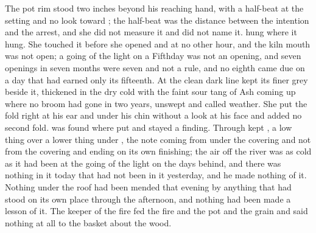 The pot rim stood two inches beyond his reaching hand, with a half-beat at the setting and no look toward ; the half-beat was the distance between the intention and the arrest, and she did not measure it and did not name it.  hung where it hung. She touched it before she opened  and at no other hour, and the kiln mouth was not open; a going of the light on a Fifthday was not an opening, and seven openings in seven months were seven and not a rule, and no eighth came due on a day that had earned only its fifteenth. At  the clean dark line kept its finer grey beside it, thickened in the dry cold with the faint sour tang of Ash coming up where no broom had gone in two years, unswept and called weather. She put the fold right at his ear and under his chin without a look at his face and added no second fold.  was found where put and stayed a finding. Through   kept , a low thing over a lower thing under , the note coming from under the covering and not from the covering and ending on its own finishing; the air off the river was as cold as it had been at the going of the light on the days behind, and there was nothing in it today that had not been in it yesterday, and he made nothing of it. Nothing under the roof had been mended that evening by anything that had stood on its own place through the afternoon, and nothing had been made a lesson of it. The keeper of the fire fed the fire and the pot and the grain and said nothing at all to the basket about the wood.

\scenebreak

